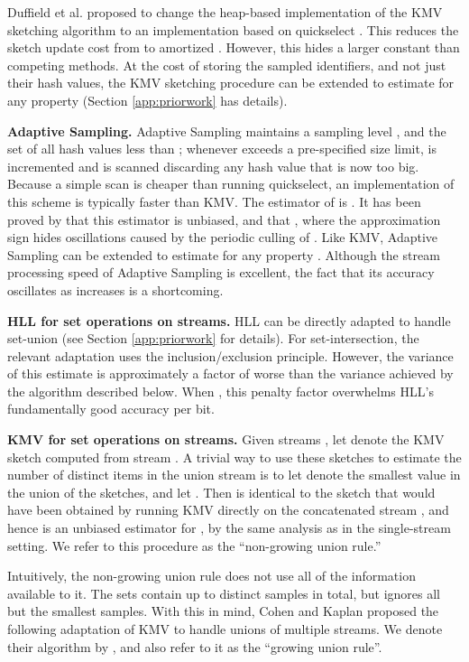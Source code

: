 \documentclass{article}
\newcommand{\edit}[1]{{#1}}
\begin{document}
Duffield et al. \cite{DuffieldLT07} proposed to change 
the heap-based implementation of the KMV sketching algorithm
to an implementation based on quickselect \cite{quickselect61}. 
This reduces the sketch update cost from  to amortized . However, this  hides a larger constant than
competing methods.
At the cost of storing the sampled identifiers, and not just their hash values, the KMV sketching procedure can be extended to estimate  for any property  (Section \ref{app:priorwork} has details).

\medskip
\noindent \textbf{Adaptive Sampling.} Adaptive Sampling maintains a sampling level , and the set 
of all hash values less than ; whenever  exceeds a pre-specified
size limit,  is incremented and  is scanned discarding any hash value
that is now too big. Because a simple scan is cheaper than running
quickselect, an implementation of this scheme is typically faster than
KMV. The estimator of  is . It has been proved by \cite{flajolet1990adaptive} that this
estimator is unbiased, and that , where the approximation sign hides oscillations caused
by the periodic culling of .  
Like KMV, Adaptive Sampling can be extended to estimate  for any property . Although the stream processing speed of Adaptive Sampling is excellent,
the fact that its accuracy oscillates as  increases is a shortcoming.

\medskip
\noindent \textbf{HLL for set operations on streams.} HLL can be directly adapted to handle set-union (see Section \ref{app:priorwork} for details). For set-intersection, the relevant adaptation uses the inclusion/exclusion principle. 
However, the variance of this estimate is approximately a factor of  worse than the variance achieved by
the  algorithm described below. When , this penalty
factor overwhelms HLL's fundamentally good accuracy per bit.

\medskip
\noindent \textbf{KMV for set operations on streams.} 
\edit{Given streams , let  denote the KMV sketch computed from stream .
A trivial way to use these sketches to estimate the number of distinct items  in the union stream 
is to let  denote the  smallest value in the union of the sketches, and let .
Then  is identical to the sketch that would have been obtained by running KMV directly on the concatenated stream ,
and hence  is an unbiased estimator for , by the same analysis as in the single-stream setting. 
We refer to this procedure as the ``non-growing union rule.''}

\edit{Intuitively, the non-growing union rule does not use all of the information available to it. The sets  contain up to 
distinct samples in total, but  ignores all but the  smallest samples. 
With this in mind, Cohen and Kaplan \cite{cohen2009leveraging} proposed the following 
adaptation of KMV to handle unions of multiple streams. We denote their algorithm by , and also refer to it as the
``growing union rule''.}
\end{document}
